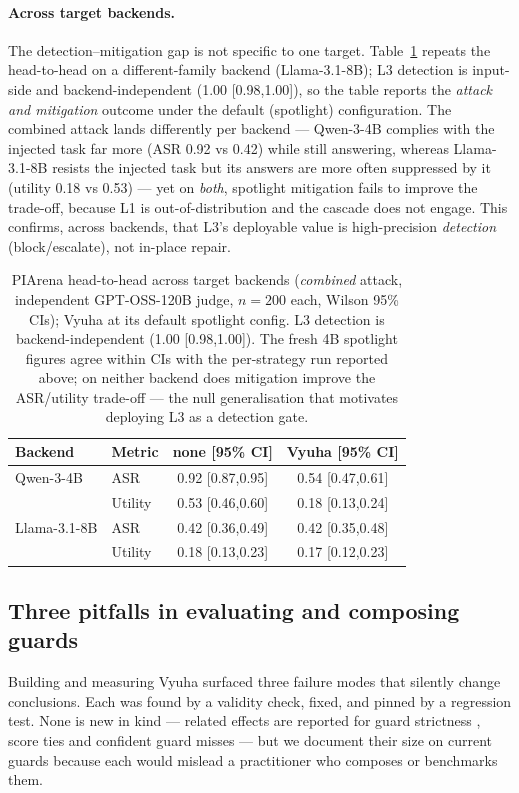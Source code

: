 \documentclass[11pt]{article}
\begin{document}
\paragraph{Across target backends.} The detection--mitigation gap is not specific to one target.
Table~\ref{tab:backends} repeats the head-to-head on a different-family backend (Llama-3.1-8B); L3
detection is input-side and backend-independent (1.00 [0.98,1.00]), so the table reports the
\emph{attack and mitigation} outcome under the default (spotlight) configuration. The combined attack
lands differently per backend --- Qwen-3-4B complies with the injected task far more (ASR 0.92 vs 0.42)
while still answering, whereas Llama-3.1-8B resists the injected task but its answers are more often
suppressed by it (utility 0.18 vs 0.53) --- yet on \emph{both}, spotlight mitigation fails to improve
the trade-off, because L1 is out-of-distribution and the cascade does not engage. This confirms, across
backends, that L3's deployable value is high-precision \emph{detection} (block/escalate), not in-place
repair.
\begin{table}[t]
\centering\footnotesize\setlength{\tabcolsep}{3pt}
\begin{tabular}{@{}llcc@{}}
\toprule
Backend & Metric & none [95\% CI] & Vyuha [95\% CI] \\
\midrule
Qwen-3-4B & ASR & 0.92 [0.87,0.95] & 0.54 [0.47,0.61] \\
 & Utility & 0.53 [0.46,0.60] & 0.18 [0.13,0.24] \\
\midrule
Llama-3.1-8B & ASR & 0.42 [0.36,0.49] & 0.42 [0.35,0.48] \\
 & Utility & 0.18 [0.13,0.23] & 0.17 [0.12,0.23] \\
\bottomrule
\end{tabular}
\caption{PIArena head-to-head across target backends (\emph{combined} attack, independent
GPT-OSS-120B judge, $n{=}200$ each, Wilson 95\% CIs); Vyuha at its default spotlight config. L3
detection is backend-independent (1.00 [0.98,1.00]). The fresh 4B spotlight figures agree within CIs
with the per-strategy run reported above; on neither backend does mitigation improve the ASR/utility
trade-off --- the null generalisation that motivates deploying L3 as a detection gate.}
\label{tab:backends}
\end{table}

\subsection{Three pitfalls in evaluating and composing guards}
Building and measuring Vyuha surfaced three failure modes that silently change conclusions. Each was
found by a validity check, fixed, and pinned by a regression test. None is new in kind --- related
effects are reported for guard strictness \citep{flexguard}, score ties \citep{rank-compression} and
confident guard misses \citep{overconfident} --- but we document their size on current guards because
each would mislead a practitioner who composes or benchmarks them.
\end{document}
